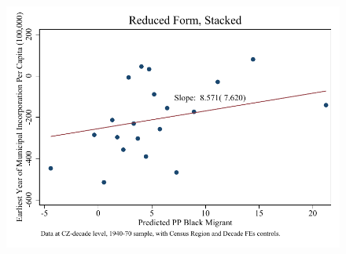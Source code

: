 \documentclass{article}
\begin{document}
\begin{figure}
\centering
\includegraphics{figures/simplefigs/stacked_cgoodman_pc_C3_urban_rf_dc.pdf}
\end{figure}
\clearpage
\end{document}
